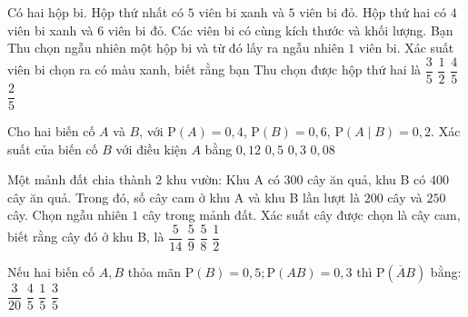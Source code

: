 \begin{ex}%
	Có hai hộp bi. Hộp thứ nhất có $5$ viên bi xanh và $5$ viên bi đỏ. Hộp thứ hai có $4$ viên bi xanh và $6$ viên bi đỏ. Các viên bi có cùng kích thước và khối lượng. Bạn Thu chọn ngẫu nhiên một hộp bi và từ đó lấy ra ngẫu nhiên $1$ viên bi. Xác suất viên  bi chọn ra có màu xanh, biết rằng bạn Thu chọn được hộp thứ hai là
	\choice 
		{$\dfrac{3}{5}$} 
		 {$\dfrac{1}{2}$}
		 {$\dfrac{4}{5}$}
		 {\True $\dfrac{2}{5}$}
\end{ex}

\begin{ex}%
	Cho hai  biến cố $A$ và $B$, với $\mathrm{P}(A)=0{,}4$, $\mathrm{P}(B)=0{,}6$, $\mathrm{P}(A\mid B)=0{,}2$. Xác suất của biến cố $B$ với điều kiện $A$ bằng
	\choice 
		{$0{,}12$} 
		{$0{,}5$} 
		 {\True $0{,}3$}
		 {$0{,}08$}
\end{ex}

\begin{ex}%
	Một mảnh đất chia thành $2$ khu vườn: Khu A có $300$ cây ăn quả, khu B có $400$ cây ăn quả. Trong đó, số cây cam ở khu A  và khu B lần lượt là $200$ cây và $250$ cây. Chọn ngẫu nhiên $1$ cây trong mảnh đất. Xác suất cây được chọn là cây cam, biết rằng cây đó ở khu B, là
	 \choice
		 {$\dfrac{5}{14}$}
		{$\dfrac{5}{9}$} 
		{\True  $\dfrac{5}{8}$}
		 {$\dfrac{1}{2}$}
\end{ex}

\begin{ex}%
	Nếu hai biến cố $A,B$ thỏa  mãn $\mathrm{P}\left(B\right)=0{,}5;\mathrm{P}\left(AB\right)=0{,}3$ thì $\mathrm{P}\left(\overline{A}B\right)$ bằng:
	\choice 
		 {$\dfrac{3}{20}$}
		 {$\dfrac{4}{5}$}
		{\True $\dfrac{1}{5}$} 
		{$\dfrac{3}{5}$} 
\end{ex}

